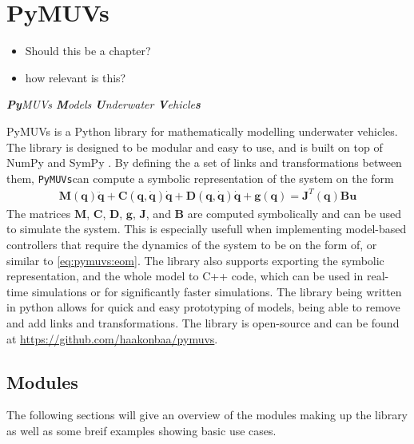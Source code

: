\chapter{PyMUVs}

{
\color{red}
\begin{itemize}
    \item Should this be a chapter?
    \item how relevant is this?
\end{itemize}
}

\emph{\textbf{Py}MUVs \textbf{M}odels \textbf{U}nderwater \textbf{V}ehicle\textbf{s}}
\newline

\newcommand{\pymuvs}{\texttt{PyMUVs}}

PyMUVs is a Python library for mathematically modelling underwater vehicles. The
library is designed to be modular and easy to use, and is built on top of NumPy
\cite{numpy} and SymPy \cite{sympy}. By defining the a set of links and transformations
between them, \pymuvs can compute a symbolic representation of the system on the
form
\begin{align}
    \bm{M}(\bm{q}) \ddot{\bm{q}} + \bm{C}(\bm{q}, \dot{\bm{q}}) \dot{\bm{q}} +
    \bm{D}(\bm{q}, \dot{\bm{q}}) \dot{\bm{q}} + \bm{g}(\bm{q}) = \bm{J}^T(\bm{q}) \bm{B} \bm{u}
    \label{eq:pymuvs:eom}
\end{align}
The matrices $\bm{M}$, $\bm{C}$, $\bm{D}$, $\bm{g}$, $\bm{J}$, and $\bm{B}$ are
computed symbolically and can be used to simulate the system. This is especially
usefull when implementing model-based controllers that require the dynamics of the
system to be on the form of, or similar to \autoref{eq:pymuvs:eom}. The library
also supports exporting the symbolic representation, and the whole model to C++
code, which can be used in real-time simulations or for significantly faster
simulations. The library being written in python allows for quick and easy
prototyping of models, being able to remove and add links and transformations.
The library is open-source and can be found at
\url{https://github.com/haakonbaa/pymuvs}. 

\section{Modules}
The following sections will give an overview of the modules making up the
library as well as some breif examples showing basic use cases.

